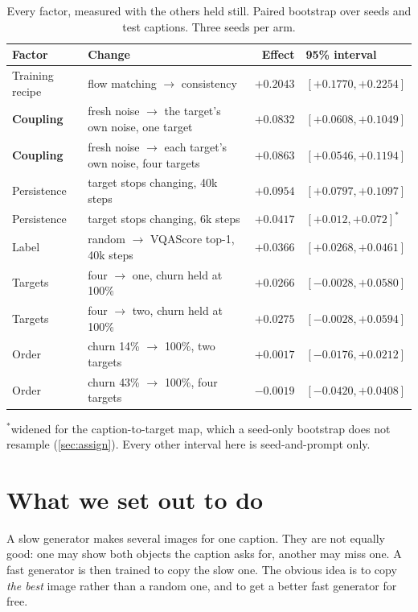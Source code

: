 \documentclass[11pt]{article}
\newcommand{\obs}[1]{\textcolor{obsblue}{#1}}
\newcommand{\bad}[1]{\textcolor{badred}{#1}}
\begin{document}
\begin{table}[h]
\centering
\caption{Every factor, measured with the others held still. Paired bootstrap over seeds and test
captions. Three seeds per arm.}
\label{tab:summary}
\small
\begin{tabular}{@{}llrl@{}}
\toprule
Factor & Change & Effect & 95\% interval \\
\midrule
Training recipe & flow matching $\to$ consistency & \obs{$+0.2043$} & \obs{$[+0.1770,+0.2254]$} \\
\textbf{Coupling} & fresh noise $\to$ the target's own noise, one target & \obs{$\mathbf{+0.0832}$} & \obs{$[+0.0608,+0.1049]$} \\
\textbf{Coupling} & fresh noise $\to$ each target's own noise, four targets & \obs{$\mathbf{+0.0863}$} & \obs{$[+0.0546,+0.1194]$} \\
Persistence & target stops changing, \obs{40}k steps & \obs{$+0.0954$} & \obs{$[+0.0797,+0.1097]$} \\
Persistence & target stops changing, \obs{6}k steps & \obs{$+0.0417$} & \obs{$[+0.012,+0.072]^{\ast}$} \\
Label & random $\to$ VQAScore top-1, \obs{40}k steps & \obs{$+0.0366$} & \obs{$[+0.0268,+0.0461]$} \\
Targets & four $\to$ one, churn held at \obs{100\%} & \obs{$+0.0266$} & \bad{$[-0.0028,+0.0580]$} \\
Targets & four $\to$ two, churn held at \obs{100\%} & \obs{$+0.0275$} & \bad{$[-0.0028,+0.0594]$} \\
Order & churn \obs{14\%} $\to$ \obs{100\%}, two targets & \bad{$+0.0017$} & \bad{$[-0.0176,+0.0212]$} \\
Order & churn \obs{43\%} $\to$ \obs{100\%}, four targets & \bad{$-0.0019$} & \bad{$[-0.0420,+0.0408]$} \\
\bottomrule
\end{tabular}

\vspace{2pt}
{\footnotesize $^{\ast}$widened for the caption-to-target map, which a seed-only bootstrap does not
resample (\cref{sec:assign}). Every other interval here is seed-and-prompt only.}
\end{table}


\section{What we set out to do}
\label{sec:goal}

A slow generator makes several images for one caption. They are not equally good: one may show both
objects the caption asks for, another may miss one. A fast generator is then trained to copy the
slow one. The obvious idea is to copy \emph{the best} image rather than a random one, and to get a
better fast generator for free.
\end{document}
